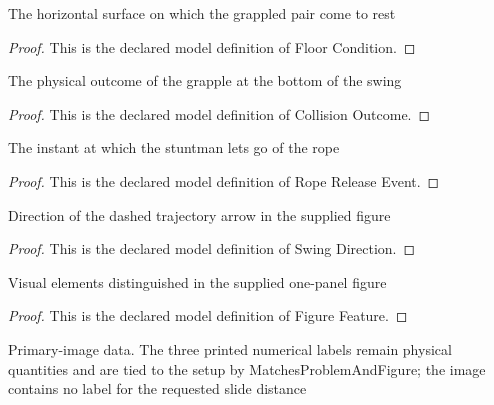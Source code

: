 \begin{definition}
  \label{def:physics:phyx-mini-0766:phyxminiproblems-problemphyxmini0766-floorcondition}
  The horizontal surface on which the grappled pair come to rest
\end{definition}
\begin{proof}
  This is the declared model definition of Floor Condition.
\end{proof}
\begin{definition}
  \label{def:physics:phyx-mini-0766:phyxminiproblems-problemphyxmini0766-collisionoutcome}
  The physical outcome of the grapple at the bottom of the swing
\end{definition}
\begin{proof}
  This is the declared model definition of Collision Outcome.
\end{proof}
\begin{definition}
  \label{def:physics:phyx-mini-0766:phyxminiproblems-problemphyxmini0766-ropereleaseevent}
  The instant at which the stuntman lets go of the rope
\end{definition}
\begin{proof}
  This is the declared model definition of Rope Release Event.
\end{proof}
\begin{definition}
  \label{def:physics:phyx-mini-0766:phyxminiproblems-problemphyxmini0766-swingdirection}
  Direction of the dashed trajectory arrow in the supplied figure
\end{definition}
\begin{proof}
  This is the declared model definition of Swing Direction.
\end{proof}
\begin{definition}
  \label{def:physics:phyx-mini-0766:phyxminiproblems-problemphyxmini0766-figurefeature}
  Visual elements distinguished in the supplied one-panel figure
\end{definition}
\begin{proof}
  This is the declared model definition of Figure Feature.
\end{proof}
\begin{definition}
  \label{def:physics:phyx-mini-0766:phyxminiproblems-problemphyxmini0766-stuntswingfigure}
  Primary-image data. The three printed numerical labels remain physical quantities and are tied to the setup by MatchesProblemAndFigure; the image contains no label for the requested slide distance
\end{definition}
